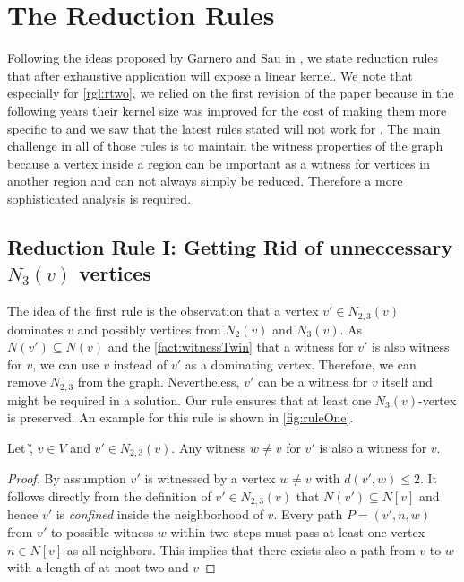 \section{The Reduction Rules}

Following the ideas proposed by Garnero and Sau in \cite[Revision 2014]{Garnero2018}, we state reduction rules that after exhaustive application will expose a linear kernel. We note that especially for \cref{rgl:rtwo}, we relied on the first revision of the paper because in the following years their kernel size was improved for the cost of making them more specific to \ptdom and we saw that the latest rules stated will not work for \psdom. 
The main challenge in all of those rules is to maintain the witness properties of the graph because a vertex inside a region can be important as a witness for vertices in another region and can not always simply be reduced. Therefore a more sophisticated analysis is required. 
\subsection{Reduction Rule I: Getting Rid of unneccessary  $N_3(v)$ vertices}


The idea of the first rule is the observation that a vertex $v' \in N_{2,3}(v)$ dominates $v$ and possibly vertices from $N_2(v)$ and $N_3(v)$. As $N(v') \subseteq N(v)$ and the \cref{fact:witnessTwin} that a witness for $v'$ is also witness for $v$, we can use $v$ instead of $v'$ as a dominating vertex. Therefore, we can remove $N_{2,3}$ from the graph. Nevertheless, $v'$ can be a witness for $v$ itself and might be required in a solution. Our rule ensures that at least one $N_3(v)$-vertex is preserved. An example for this rule is shown in \cref{fig:ruleOne}.

\begin{fact}\label{fact:witnessTwin}
Let \G, $v \in V$ and $v' \in N_{2,3}(v)$. Any witness $w \neq v$ for $v'$ is also a witness for $v$. %
\end{fact}
\begin{proof}

By assumption $v'$ is witnessed by a vertex $w \neq v$ with $d(v', w) \leq 2$. It follows directly from the definition of $v' \in N_{2,3}(v)$ that $N(v') \subseteq N[v]$ and hence $v'$ is \textit{confined} inside the neighborhood of $v$. Every path $P = (v', n, w)$ from $v'$ to possible witness $w$ within two steps must pass at least one vertex $n \in N[v]$ as all neighbors. This implies that there exists also a path from $v$ to $w$ with a length of at most two and $v$  

\end{proof}



